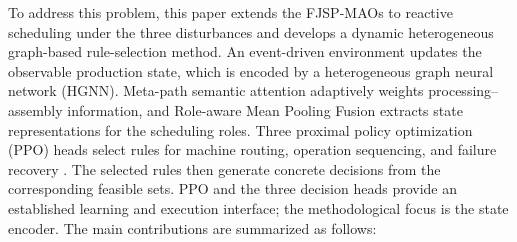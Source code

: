 




To address this problem, this paper extends the FJSP-MAOs to reactive scheduling under the three disturbances
and develops a dynamic heterogeneous graph-based rule-selection method. An event-driven environment
updates the observable production state, which is encoded by a heterogeneous graph neural network (HGNN).
Meta-path semantic attention adaptively weights processing--assembly information,
and Role-aware Mean Pooling Fusion extracts state representations for the scheduling roles.
Three proximal policy optimization (PPO) heads select rules for machine routing, operation sequencing, and failure recovery
\cite{schulman2017ppo}. The selected rules then generate concrete decisions from the
corresponding feasible sets. PPO and the three decision heads provide an established learning and execution interface; the methodological focus is the state encoder. The main contributions are summarized as follows:


